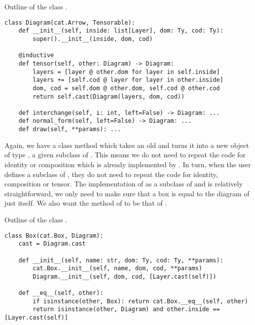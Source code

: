 \begin{python}\label{listing:monoidal.Diagram}
{\normalfont Outline of the class .}

\begin{verbatim}
class Diagram(cat.Arrow, Tensorable):
    def __init__(self, inside: list[Layer], dom: Ty, cod: Ty):
        super().__init__(inside, dom, cod)

    @inductive
    def tensor(self, other: Diagram) -> Diagram:
        layers = [layer @ other.dom for layer in self.inside]
        layers += [self.cod @ layer for layer in other.inside]
        dom, cod = self.dom @ other.dom, self.cod @ other.cod
        return self.cast(Diagram(layers, dom, cod))

    def interchange(self, i: int, left=False) -> Diagram: ...
    def normal_form(self, left=False) -> Diagram: ...
    def draw(self, **params): ...
\end{verbatim}
\end{python}

Again, we have a class method  which takes an old  and turns it into a new object of type , a given subclass of .
This means we do not need to repeat the code for identity or composition which is already implemented by .
In turn, when the user defines a subclass of , they do not need to repeat the code for identity, composition or tensor.
The implementation of  as a subclass of  and  is relatively straightforward, we only need to make sure that a box is equal to the diagram of just itself.
We also want the  method of  to be that of .

\begin{python}
{\normalfont Outline of the class .}
\begin{verbatim}
class Box(cat.Box, Diagram):
    cast = Diagram.cast

    def __init__(self, name: str, dom: Ty, cod: Ty, **params):
        cat.Box.__init__(self, name, dom, cod, **params)
        Diagram.__init__(self, dom, cod, [Layer.cast(self)])

    def __eq__(self, other):
        if isinstance(other, Box): return cat.Box.__eq__(self, other)
        return isinstance(other, Diagram) and other.inside == [Layer.cast(self)]
\end{verbatim}
\end{python}

